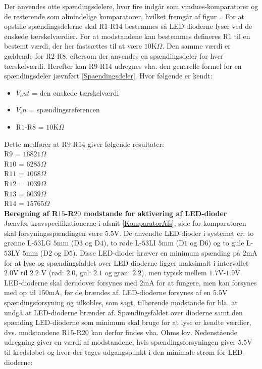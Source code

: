 Der anvendes otte spændingsdelere, hvor fire indgår som vindues-komparatorer og de resterende som almindelige komparatorer, hvilket fremgår af figur .. 
For at opstille spændingsdelerne skal R$1$-R$14$ bestemmes så LED-dioderne lyser ved de ønskede tærskelværdier. For at modstandene kan bestemmes defineres R$1$ til en bestemt værdi, der her fastsættes til at være $10$K$\Omega$. Den samme værdi er gældende for R$2$-R$8$, eftersom der anvendes en spændingsdeler for hver tærskelværdi. Herefter kan R$9$-R$14$ udregnes vha. den generelle formel for en spændingsdeler jævnført \eqref{Spaendingsdeler}. Hvor følgende er kendt:
\begin{itemize}
\item $V_out$ = den ønskede tærskelværdi
\item $V_in$ = spændingsreferencen
\item R$1$-R$8$ = $10$K$\Omega$
\end{itemize}

Dette medfører at R$9$-R$14$ giver følgende resultater:\\
R$9$ = $16821\Omega$ \\
R$10$ = $6285\Omega$ \\
R$11$ = $1068\Omega$ \\
R$12$ = $1039\Omega$ \\
R$13$ = $6039\Omega$ \\
R$14$ = $15765\Omega$ \\


\noindent\textbf{Beregning af R$15$-R$20$ modstande for aktivering af LED-dioder} \\
Jænvfør kravspecifikationerne i afsnit \ref{KomparatorAfs}, side \pageref{KomparatorAfs} for komparatoren skal forsyningsspændingen være $5.5$V. De anvendte LED-dioder i systemet er: to grønne L-$53$LG $5$mm (D$3$ og D$4$), to røde L-$53$LI $5$mm (D$1$ og D$6$) og to gule L-$53$LY $5$mm (D$2$ og D$5$). Disse LED-dioder kræver en minimum spænding på 2mA for at lyse og spændingsfaldet over LED-dioderne ligger maksimalt i intervallet $2.0$V til $2.2$ V (rød: $2.0$, gul: $2.1$ og grøn: $2.2$), men typisk mellem $1.7$V-$1.9$V. LED-dioderne skal derudover forsynes med $2$mA for at fungere, men kan forsynes med op til $150$mA, før de brændes af. LED-dioderne forsynes af en $5.5$V spændingsforsyning og tilkobles, som sagt, tilhørende modstande for bla. at undgå at LED-dioderne brænder af. Spændingsfaldet over dioderne samt den spænding LED-dioderne som minimum skal bruge for at lyse er kendte værdier, dvs. modstandene R$15$-R$20$ kan derfor findes vha. Ohms lov. Nedenstående udregning giver en værdi af modstandene, hvis spændingsforsyningen giver $5.5$V til kredsløbet og hvor der tages udgangspunkt i den minimale strøm for LED-dioderne:

